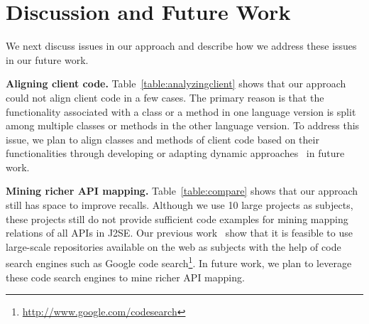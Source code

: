 

\section{Discussion and Future Work}
\label{sec:discuss}

We next discuss issues in our approach and describe how we address
these issues in our future work.

\textbf{Aligning client code.} Table~\ref{table:analyzingclient}
shows that our approach could not align client code in a few cases.
The primary reason is that the functionality associated with a class
or a method in one language version is split among multiple classes
or methods in the other language version. To address this issue, we
plan to align classes and methods of client code based on their
functionalities through developing or adapting dynamic approaches~\cite{jiang2009automatic} in future work.

\textbf{Mining richer API mapping.} Table~\ref{table:compare} shows
that our approach still has space to improve recalls. Although we
use 10 large projects as subjects, these projects still do not
provide sufficient code examples for mining mapping relations of all
APIs in J2SE. Our previous
work~\cite{thummalapenta07parseweb,thummalapentaase08spotweb} show
that it is feasible to use large-scale repositories available on the
web as subjects with the help of code search engines such as Google
code search\footnote{\url{http://www.google.com/codesearch}}. In
future work, we plan to leverage these code search engines to mine
richer API mapping.


